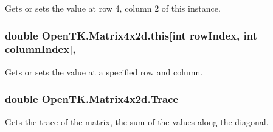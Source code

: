 Gets or sets the value at row 4, column 2 of this instance. 

\hypertarget{struct_open_t_k_1_1_matrix4x2d_a56f4ac1746221ac33188afb533d40c9d}{
\subsubsection[{this[int row\-Index, int column\-Index]}]{\setlength{\rightskip}{0pt plus 5cm}double Open\-T\-K.\-Matrix4x2d.\-this\mbox{[}int row\-Index, int column\-Index\mbox{]}\hspace{0.3cm}{\ttfamily [get]}, {\ttfamily [set]}}}\label{struct_open_t_k_1_1_matrix4x2d_a56f4ac1746221ac33188afb533d40c9d}


Gets or sets the value at a specified row and column. 

\hypertarget{struct_open_t_k_1_1_matrix4x2d_a8b695729fd8046a59b9472ce75d3c379}{
\subsubsection[{Trace}]{\setlength{\rightskip}{0pt plus 5cm}double Open\-T\-K.\-Matrix4x2d.\-Trace\hspace{0.3cm}{\ttfamily [get]}}}\label{struct_open_t_k_1_1_matrix4x2d_a8b695729fd8046a59b9472ce75d3c379}


Gets the trace of the matrix, the sum of the values along the diagonal. 

